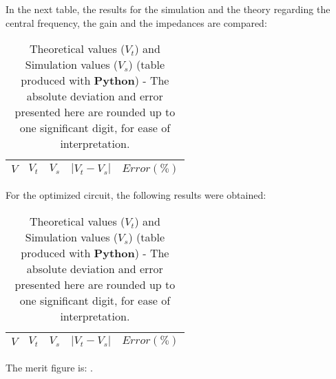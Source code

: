 In the next table, the results for the simulation and the theory regarding the central frequency, the gain and the impedances are compared:

\begin{table}[H]
  \centering
  \begin{tabular}{|c|c|c|c|c|}
    \hline
        $V$ & $V_t$ & $V_s$ & $|V_t-V_s|$ & $Error (\%)$ \\
        \hline
        \hline
        
        \hline
  \end{tabular}
  \caption{Theoretical values ($V_t$) and Simulation values ($V_s$) (table produced with {\bf Python})  - The absolute deviation and error presented here are rounded up to one significant digit, for ease of interpretation.}
  \label{error1_res}
\end{table}

For the optimized circuit, the following results were obtained:

\begin{table}[H]
  \centering
  \begin{tabular}{|c|c|c|c|c|}
    \hline
        $V$ & $V_t$ & $V_s$ & $|V_t-V_s|$ & $Error (\%)$ \\
        \hline
        \hline
        
        \hline
  \end{tabular}
  \caption{Theoretical values ($V_t$) and Simulation values ($V_s$) (table produced with {\bf Python})  - The absolute deviation and error presented here are rounded up to one significant digit, for ease of interpretation.}
  \label{error2_res}
\end{table}

The merit figure is: .

